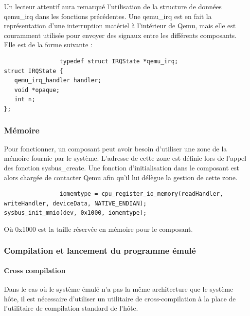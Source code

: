 \documentclass{article}
\begin{document}
			Un lecteur attentif aura remarqué l'utilisation de la structure de données qemu\_irq dans les fonctions précédentes. Une qemu\_irq est 
			en fait la représentation d'une interruption matériel à l’intérieur de Qemu, mais elle est couramment utilisée pour envoyer des signaux 
			entre les différents composants. Elle est de la forme suivante : 
			\begin{verbatim}
				typedef struct IRQState *qemu_irq;
struct IRQState {
   qemu_irq_handler handler;
   void *opaque;
   int n;
};
			\end{verbatim}
			
		\subsubsection{Mémoire}
			Pour fonctionner, un composant peut avoir besoin d'utiliser une zone de la mémoire fournie par le système. L'adresse de cette zone est 
			définie lors de l'appel des fonction sysbus\_create. Une fonction d'initialisation dans le composant est alors chargée de contacter Qemu 
			afin qu'il lui délègue la gestion de cette zone. 
			\begin{verbatim}
				iomemtype = cpu_register_io_memory(readHandler, writeHandler, deviceData, NATIVE_ENDIAN);
sysbus_init_mmio(dev, 0x1000, iomemtype);
			\end{verbatim}
			Où 0x1000 est la taille réservée en mémoire pour le composant. 
			
		\subsubsection{Compilation et lancement du programme émulé}
			\paragraph{Cross compilation\\}
			Dans le cas où le système émulé n'a pas la même architecture que le système hôte, il est nécessaire d'utiliser un utilitaire de 
			cross-compilation à la place de l'utilitaire de compilation standard de l'hôte. 
			
\end{document}
